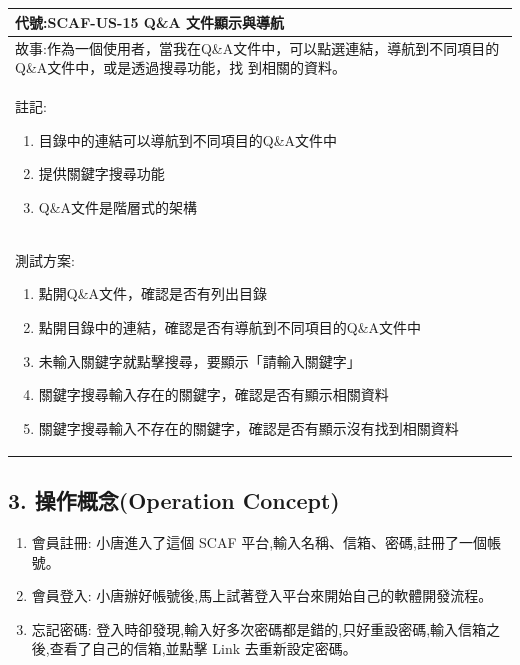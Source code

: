 \documentclass{report}
\begin{document}
\subsection*{}
\fontsize{12}{20}\selectfont
\begin{tabularx}{\textwidth}{|X|}
  \hline
  代號:SCAF-US-15 Q\&A 文件顯示與導航 \\
  \hline
  故事:作為一個使用者，當我在Q\&A文件中，可以點選連結，導航到不同項目的Q\&A文件中，或是透過搜尋功能，找
  到相關的資料。 \\
  \hline
  註記:
  \begin{enumerate}
    \item 目錄中的連結可以導航到不同項目的Q\&A文件中
    \item 提供關鍵字搜尋功能
    \item Q\&A文件是階層式的架構
  \end{enumerate} \\
  \hline
  測試方案:
  \begin{enumerate}
    \item 點開Q\&A文件，確認是否有列出目錄
    \item 點開目錄中的連結，確認是否有導航到不同項目的Q\&A文件中
    \item 未輸入關鍵字就點擊搜尋，要顯示「請輸入關鍵字」
    \item 關鍵字搜尋輸入存在的關鍵字，確認是否有顯示相關資料
    \item 關鍵字搜尋輸入不存在的關鍵字，確認是否有顯示沒有找到相關資料
  \end{enumerate} \\
  \hline
\end{tabularx}


\subsection*{3. 操作概念(Operation
 Concept)}

\begin{enumerate}[label=(\Alph*)]
  \item 會員註冊: 小唐進入了這個 SCAF 平台,輸入名稱、信箱、密碼,註冊了一個帳號。
  \item 會員登入: 小唐辦好帳號後,馬上試著登入平台來開始自己的軟體開發流程。
  \item 忘記密碼: 登入時卻發現,輸入好多次密碼都是錯的,只好重設密碼,輸入信箱之後,查看了自己的信箱,並點擊 Link 去重新設定密碼。
\end{enumerate}
\end{document}
